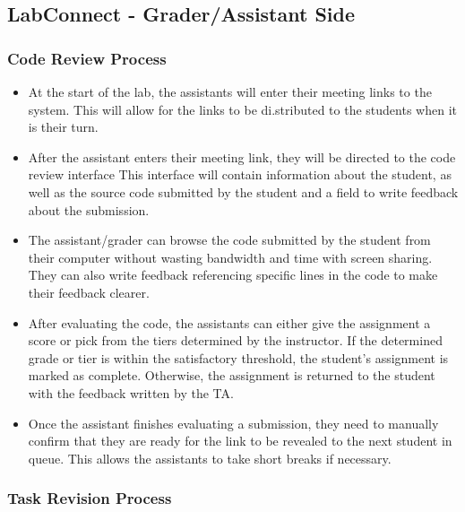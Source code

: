 \documentclass[a4paper, 12pt]{article}
\begin{document}
    \subsection{LabConnect - Grader/Assistant Side}

    \subsubsection{Code Review Process}

    \begin{itemize}
        \item At the start of the lab, the assistants will enter their meeting links to the system.
        This will allow for the links to be di.stributed to the students when it is their turn.
        \item After the assistant enters their meeting link, they will be directed to the code review interface
        This interface will contain information about the student, as well as the source code submitted by the student
        and a field to write feedback about the submission.
        \item The assistant/grader can browse the code submitted by the student from their computer without wasting bandwidth
        and time with screen sharing. They can also write feedback referencing specific lines in the code to make their
        feedback clearer.
        \item After evaluating the code, the assistants can either give the assignment a score or pick
          from the tiers determined by the instructor. If the determined grade or tier is within the satisfactory
          threshold, the student's assignment is marked as complete. Otherwise, the assignment is returned to the
          student with the feedback written by the TA.
        \item Once the assistant finishes evaluating a submission, they need to manually confirm that they are
          ready for the link to be revealed to the next student in queue. This allows the assistants to take short
          breaks if necessary.
    \end{itemize}

    \subsubsection{Task Revision Process}
\end{document}
